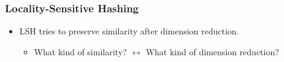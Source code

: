 \documentclass[compress]{beamer}
\theoremstyle{plain}
\begin{document}
\begin{frame}
\frametitle{Locality-Sensitive Hashing}
\begin{itemize}
\item LSH tries to preserve similarity after dimension reduction.
\begin{itemize}
\item What kind of similarity? $\leftrightarrow$ What kind of dimension reduction?
\end{itemize}
\end{itemize}
\end{frame}


%
%
\end{document}
